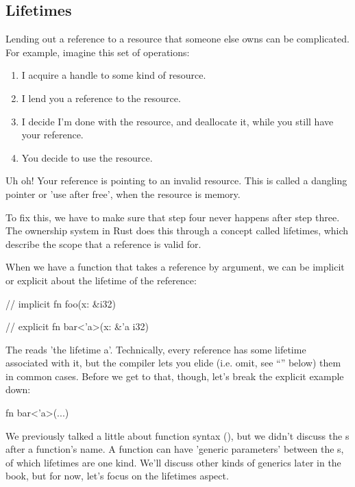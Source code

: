 \subsection*{Lifetimes}

Lending out a reference to a resource that someone else owns can be complicated. For example, imagine this set of operations:

\begin{enumerate}
  \item{I acquire a handle to some kind of resource.}
  \item{I lend you a reference to the resource.}
  \item{I decide I'm done with the resource, and deallocate it, while you still have your reference.}
  \item{You decide to use the resource.}
\end{enumerate}

Uh oh! Your reference is pointing to an invalid resource. This is called a dangling pointer or 'use after free', when the resource 
is memory.

\blank

To fix this, we have to make sure that step four never happens after step three. The ownership system in Rust does this through a 
concept called lifetimes, which describe the scope that a reference is valid for.

\blank

When we have a function that takes a reference by argument, we can be implicit or explicit about the lifetime of the reference:

\begin{rustc}
// implicit
fn foo(x: &i32) {
}

// explicit
fn bar<'a>(x: &'a i32) {
}
\end{rustc}

The  reads 'the lifetime a'. Technically, every reference has some lifetime associated with it, but the compiler lets 
you elide (i.e. omit, see \enquote{} below) them in common cases. Before we get to that, though, let's break the explicit 
example down:

\begin{rustc}
fn bar<'a>(...)
\end{rustc}

We previously talked a little about function syntax (), but we didn't discuss the \code{<>}s after 
a function's name. A function can have 'generic parameters' between the \code{<>}s, of which lifetimes are one kind. We'll discuss 
other kinds of generics later in the book, but for now, let's focus on the lifetimes aspect.


